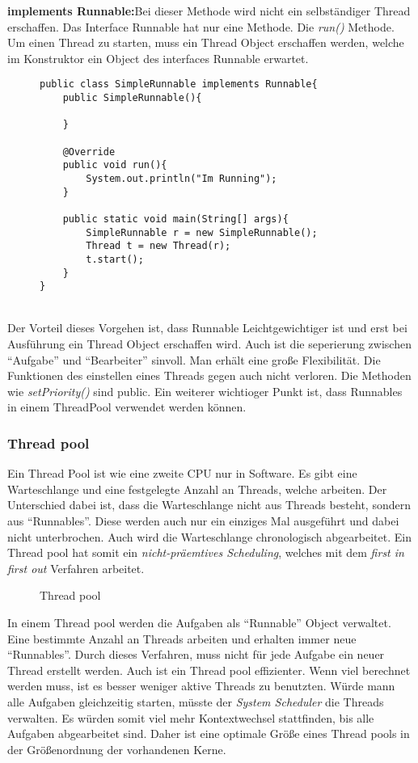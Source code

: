 \smallskip
\newline
\textbf{implements Runnable:}Bei dieser Methode wird nicht ein selbständiger Thread erschaffen. Das Interface Runnable hat nur eine Methode. Die \textit{run()} Methode.\cite{Java:Runnable} Um einen Thread zu starten, muss ein Thread Object erschaffen werden, welche im Konstruktor ein Object des interfaces Runnable erwartet.
\begin{figure}[h]
\begin{lstlisting}
public class SimpleRunnable implements Runnable{
    public SimpleRunnable(){

    }

    @Override
    public void run(){
        System.out.println("Im Running");
    }

    public static void main(String[] args){
        SimpleRunnable r = new SimpleRunnable();
        Thread t = new Thread(r);
        t.start();
    }
}
\end{lstlisting}
\end{figure}
\\Der Vorteil dieses Vorgehen ist, dass Runnable Leichtgewichtiger ist und erst bei Ausführung ein Thread Object erschaffen wird. Auch ist die seperierung zwischen ``Aufgabe'' und ``Bearbeiter'' sinvoll. Man erhält eine große Flexibilität. Die Funktionen des einstellen eines Threads gegen auch nicht verloren. Die Methoden wie \textit{setPriority()} sind public.\cite{Java:Thread} Ein weiterer wichtioger Punkt ist, dass Runnables in einem ThreadPool verwendet werden können.

\subsubsection{Thread pool}
Ein Thread Pool ist wie eine zweite CPU nur in Software. Es gibt eine Warteschlange und eine festgelegte Anzahl an Threads, welche arbeiten. Der Unterschied dabei ist, dass die Warteschlange nicht aus Threads besteht, sondern aus ``Runnables''. Diese werden auch nur ein einziges Mal ausgeführt und dabei nicht unterbrochen. Auch wird die Warteschlange chronologisch abgearbeitet. Ein Thread pool hat somit ein \textit{nicht-präemtives Scheduling}, welches mit dem \textit{first in first out} Verfahren arbeitet.\newpage
\begin{figure}[h]
    
    \caption{Thread pool}
\end{figure}
In einem Thread pool werden die Aufgaben als ``Runnable'' Object verwaltet. Eine bestimmte Anzahl an Threads arbeiten und erhalten immer neue ``Runnables''. Durch dieses Verfahren, muss nicht für jede Aufgabe ein neuer Thread erstellt werden. Auch ist ein Thread pool effizienter. Wenn viel berechnet werden muss, ist es besser weniger aktive Threads zu benutzten. Würde mann alle Aufgaben gleichzeitig starten, müsste der \textit{System Scheduler} die Threads verwalten. Es würden somit viel mehr Kontextwechsel stattfinden, bis alle Aufgaben abgearbeitet sind. Daher ist eine optimale Größe eines Thread pools in der Größenordnung der vorhandenen Kerne.\cite{ThreadPool:Java}

